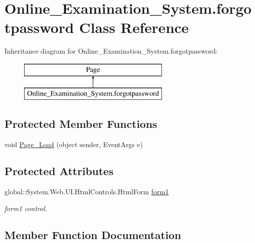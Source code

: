 \hypertarget{class_online___examination___system_1_1forgotpassword}{}\section{Online\+\_\+\+Examination\+\_\+\+System.\+forgotpassword Class Reference}
\label{class_online___examination___system_1_1forgotpassword}
Inheritance diagram for Online\+\_\+\+Examination\+\_\+\+System.\+forgotpassword\+:\begin{figure}[H]
\begin{center}
\leavevmode
\includegraphics[height=2.000000cm]{class_online___examination___system_1_1forgotpassword}
\end{center}
\end{figure}
\subsection*{Protected Member Functions}
\begin{DoxyCompactItemize}
\item 
void \mbox{\hyperlink{class_online___examination___system_1_1forgotpassword_aabd4b0301cd4d3b9d6f4b732f26b4479}{Page\+\_\+\+Load}} (object sender, Event\+Args e)
\end{DoxyCompactItemize}
\subsection*{Protected Attributes}
\begin{DoxyCompactItemize}
\item 
global\+::\+System.\+Web.\+U\+I.\+Html\+Controls.\+Html\+Form \mbox{\hyperlink{class_online___examination___system_1_1forgotpassword_afdbd2f24cb6b7a190f8193118738d20c}{form1}}
\begin{DoxyCompactList}\small\item\em form1 control. \end{DoxyCompactList}\end{DoxyCompactItemize}


\subsection{Member Function Documentation}
\mbox{\label{class_online___examination___system_1_1forgotpassword_aabd4b0301cd4d3b9d6f4b732f26b4479}} 
